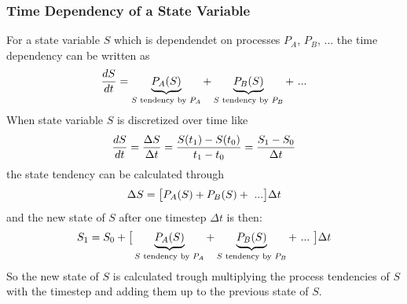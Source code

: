 \documentclass[a4paper,10pt,english]{sphinxmanual}
\begin{document}
\subsubsection{Time Dependency of a State Variable}
\label{architecture:time-dependency-of-a-state-variable}
For a state variable \(S\) which is dependendet on processes \(P_A\), \(P_B\), ... the time dependency can be written as
\begin{gather}
\begin{split}\frac{dS}{dt} = \underbrace{P_A(S)}_{S \textrm{ tendency by }P_A} + \underbrace{P_B(S)}_{S \textrm{ tendency by } P_B} + \ ...\end{split}\notag
\end{gather}
When state variable \(S\) is discretized over time like
\begin{gather}
\begin{split}\frac{dS}{dt} = \frac{\Delta S}{\Delta t} = \frac{S(t_1) - S(t_0)}{t_1 - t_0} = \frac{S_1 - S_0}{\Delta t}\end{split}\notag
\end{gather}
the state tendency can be calculated through
\begin{gather}
\begin{split}\Delta S = \big[ P_A(S) + P_B(S) + \ ... \big] \Delta t\end{split}\notag
\end{gather}
and the new state of \(S\) after one timestep \(\Delta t\) is then:
\begin{gather}
\begin{split}S_1 = S_0 + \big[ \underbrace{P_A(S)}_{S \textrm{ tendency by }P_A} + \underbrace{P_B(S)}_{S \textrm{ tendency by }P_B} + \ ... \ \big] \Delta t\end{split}\notag
\end{gather}
So the new state of \(S\) is calculated trough multiplying the process tendencies of \(S\) with the timestep and adding them up to the previous state of \(S\).
\end{document}
